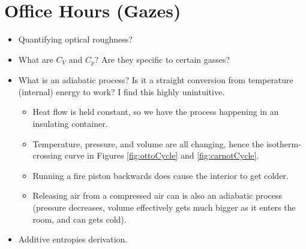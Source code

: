 \documentclass[../notes.tex]{subfiles}
\begin{document}
\section{Office Hours (Gazes)}
\begin{itemize}
    \item Quantifying optical roughness?
    \item What are $C_V$ and $C_p$? Are they specific to certain gasses?
    \item What is an adiabatic process? Is it a straight conversion from temperature (internal) energy to work? I find this highly unintuitive.
    \begin{itemize}
        \item Heat flow is held constant, so we have the process happening in an insulating container.
        \item Temperature, pressure, and volume are all changing, hence the isotherm-crossing curve in Figures \ref{fig:ottoCycle} and \ref{fig:carnotCycle}.
        \item Running a fire piston backwards does cause the interior to get colder.
        \item Releasing air from a compressed air can is also an adiabatic process (pressure decreases, volume effectively gets much bigger as it enters the room, and can gets cold).
    \end{itemize}
    \item Additive entropies derivation.
\end{itemize}
\end{document}
